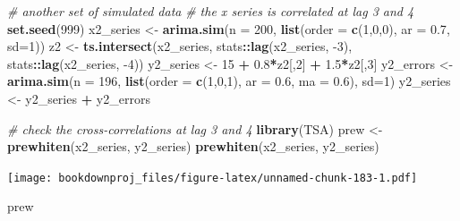 \documentclass[
]{article}
\newenvironment{Shaded}{\begin{snugshade}}{\end{snugshade}}
\newcommand{\CommentTok}[1]{\textcolor[rgb]{0.56,0.35,0.01}{\textit{#1}}}
\newcommand{\DataTypeTok}[1]{\textcolor[rgb]{0.13,0.29,0.53}{#1}}
\newcommand{\DecValTok}[1]{\textcolor[rgb]{0.00,0.00,0.81}{#1}}
\newcommand{\FloatTok}[1]{\textcolor[rgb]{0.00,0.00,0.81}{#1}}
\newcommand{\KeywordTok}[1]{\textcolor[rgb]{0.13,0.29,0.53}{\textbf{#1}}}
\newcommand{\NormalTok}[1]{#1}
\newcommand{\OperatorTok}[1]{\textcolor[rgb]{0.81,0.36,0.00}{\textbf{#1}}}
\newcommand{\StringTok}[1]{\textcolor[rgb]{0.31,0.60,0.02}{#1}}
\begin{document}
\begin{Shaded}
\begin{Highlighting}[]
\CommentTok{# another set of simulated data }
\CommentTok{# the x series is correlated at lag 3 and 4}
\KeywordTok{set.seed}\NormalTok{(}\DecValTok{999}\NormalTok{)}
\NormalTok{x2_series <-}\StringTok{ }\KeywordTok{arima.sim}\NormalTok{(}\DataTypeTok{n =} \DecValTok{200}\NormalTok{, }\KeywordTok{list}\NormalTok{(}\DataTypeTok{order =} \KeywordTok{c}\NormalTok{(}\DecValTok{1}\NormalTok{,}\DecValTok{0}\NormalTok{,}\DecValTok{0}\NormalTok{), }\DataTypeTok{ar =} \FloatTok{0.7}\NormalTok{, }\DataTypeTok{sd=}\DecValTok{1}\NormalTok{))}
\NormalTok{z2 <-}\StringTok{ }\KeywordTok{ts.intersect}\NormalTok{(x2_series, stats}\OperatorTok{::}\KeywordTok{lag}\NormalTok{(x2_series, }\DecValTok{-3}\NormalTok{), stats}\OperatorTok{::}\KeywordTok{lag}\NormalTok{(x2_series, }\DecValTok{-4}\NormalTok{)) }
\NormalTok{y2_series <-}\StringTok{ }\DecValTok{15} \OperatorTok{+}\StringTok{ }\FloatTok{0.8}\OperatorTok{*}\NormalTok{z2[,}\DecValTok{2}\NormalTok{] }\OperatorTok{+}\StringTok{ }\FloatTok{1.5}\OperatorTok{*}\NormalTok{z2[,}\DecValTok{3}\NormalTok{] }
\NormalTok{y2_errors <-}\StringTok{ }\KeywordTok{arima.sim}\NormalTok{(}\DataTypeTok{n =} \DecValTok{196}\NormalTok{, }\KeywordTok{list}\NormalTok{(}\DataTypeTok{order =} \KeywordTok{c}\NormalTok{(}\DecValTok{1}\NormalTok{,}\DecValTok{0}\NormalTok{,}\DecValTok{1}\NormalTok{), }\DataTypeTok{ar =} \FloatTok{0.6}\NormalTok{, }\DataTypeTok{ma =} \FloatTok{0.6}\NormalTok{), }\DataTypeTok{sd=}\DecValTok{1}\NormalTok{)}
\NormalTok{y2_series <-}\StringTok{ }\NormalTok{y2_series }\OperatorTok{+}\StringTok{ }\NormalTok{y2_errors}

\CommentTok{# check the cross-correlations at lag 3 and 4}
\KeywordTok{library}\NormalTok{(TSA)}
\NormalTok{prew <-}\StringTok{ }\KeywordTok{prewhiten}\NormalTok{(x2_series, y2_series) }
\KeywordTok{prewhiten}\NormalTok{(x2_series, y2_series)}
\end{Highlighting}
\end{Shaded}

\texttt{[image: bookdownproj\_files/figure-latex/unnamed-chunk-183-1.pdf]}

\begin{Shaded}
\begin{Highlighting}[]
\NormalTok{prew}
\end{Highlighting}
\end{Shaded}
\end{document}
